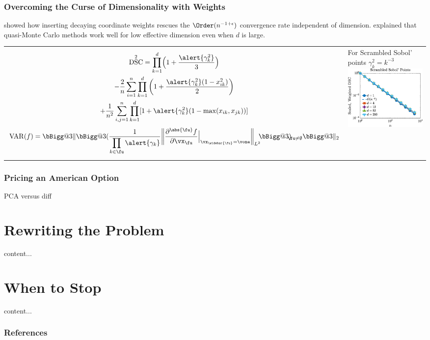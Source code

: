 \documentclass[10pt,compress,xcolor={usenames,dvipsnames}]{beamer} %
\makeatletter
\newcommand{\vast}{\bBigg@{3}}
\DeclareMathOperator{\disc}{DSC}
\DeclareMathOperator{\Var}{VAR}
\makeatother
\begin{document}
\begin{frame}
	\frametitle{Overcoming the Curse of Dimensionality with Weights}
	\vspace{-4ex}
	 showed how inserting decaying coordinate weights rescues the $\Order(n^{-1+\epsilon})$ convergence rate \alert{independent of dimension}.   explained that quasi-Monte Carlo methods work well for \alert{low effective dimension} even when $d$ is large.
	
	\vspace{-5ex}
	\begin{tabular}{m{6cm}>{\centering}m{5.5cm}}
		\begin{multline*}
		\disc^2 = \prod_{k=1}^d\Bigl(1 + \frac{\alert{\gamma_k^2}}{3}\Bigr) \\
			- \frac{2}{n} \sum_{i=1}^n \prod_{k=1}^d \left (1 + \frac{\alert{\gamma_k^2}(1 - x_{ik}^2)}{2} \right) \\ + \frac{1}{n^2}\sum_{i,j=1}^n \prod_{k = 1}^d [1 + \alert{\gamma_k^2}( 1 - \max(x_{ik},x_{jk}))]
		\end{multline*}
		\[ 	\Var(f) = \vast \lVert \vast ( \frac{1}{\displaystyle\prod_{k \in \fu} \alert{\gamma_k}}\biggl \lVert\frac{\partial^{\abs{\fu}} f}{\partial \vx_\fu} \Bigr \rvert_{\vx_{\widebar{\fu}} = \vone}\biggr\rVert_{L^2}\!\!\vast )_{\!\!\!\!\fu \ne \emptyset} \vast \rVert_2 \]
		& 
		For Scrambled Sobol' points \newline $\gamma_k^2 = k^{-3}$\newline
		\includegraphics[width = 5.5cm]{ProgramsImages/WtL2Disc.eps}
	\end{tabular}
\end{frame}

\begin{frame}
	\frametitle{Pricing an American Option}
	PCA versus diff
\end{frame}


\section{Rewriting the Problem}

\begin{frame}
	content...
\end{frame}




\section{When to Stop}
\begin{frame}
	content...
\end{frame}



\begin{frame}[allowframebreaks]\frametitle{References}
	
\end{frame}
\end{document}

